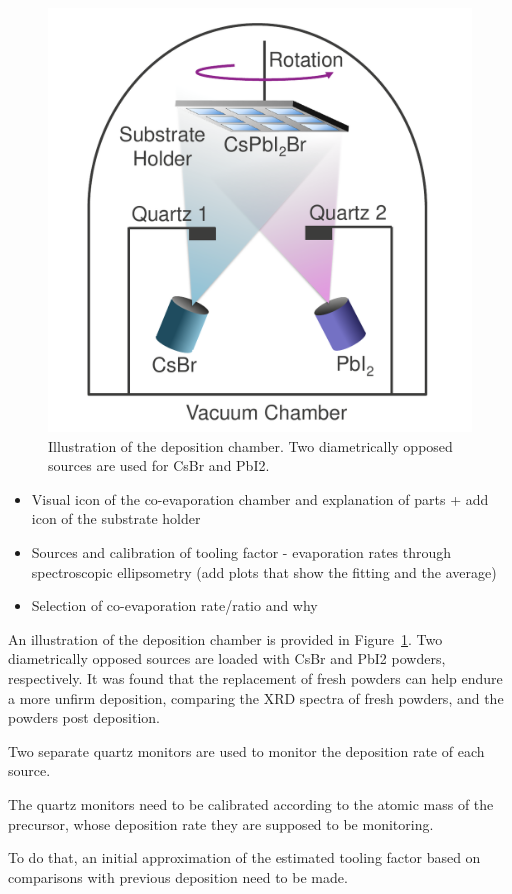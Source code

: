 \begin{figure}
  \centering
  \medskip
  \includegraphics[width=.5\textwidth]{chapters/material_properties/images/Chamber.pdf}
  \caption[Short caption for Table of Figures]{Illustration of the deposition chamber. Two diametrically opposed sources are used for CsBr and PbI2.}
  \label{fig:deposition_chamber}
\end{figure}



\begin{itemize}
    \item Visual icon of the co-evaporation chamber and explanation of parts + add icon of the substrate holder
    \item Sources and calibration of tooling factor - evaporation rates through spectroscopic ellipsometry (add plots that show the fitting and the average)
    \item Selection of co-evaporation rate/ratio and why
\end{itemize}

An illustration of the deposition chamber is provided in Figure~\ref{fig:deposition_chamber}. Two diametrically opposed sources are loaded with CsBr and PbI2 powders, respectively. It was found that the replacement of fresh powders can help endure a more unfirm deposition, comparing the XRD spectra of fresh powders, and the powders post deposition. 


Two separate quartz monitors are used to monitor the deposition rate of each source. 

The quartz monitors need to be calibrated according to the atomic mass of the precursor, whose deposition rate they are supposed to be monitoring. 

To do that, an initial approximation of the estimated tooling factor based on comparisons with previous deposition need to be made. 

